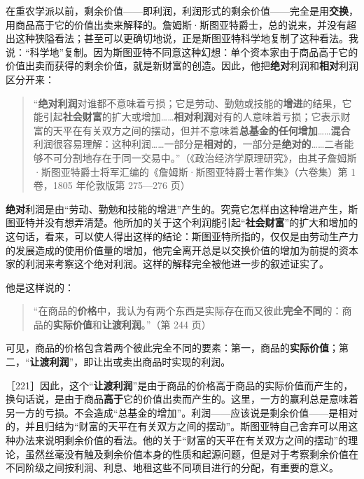 

在重农学派以前，剩余价值——即利润，利润形式的剩余价值——完全是用\textbf{交换}，用商品高于它的价值出卖来解释的。詹姆斯·斯图亚特爵士，总的说来，并没有超出这种狭隘看法；甚至可以更确切地说，正是斯图亚特科学地复制了这种看法。我说：“科学地”复制。因为斯图亚特不同意这种幻想：单个资本家由于商品高于它的价值出卖而获得的剩余价值，就是新财富的创造。因此，他把\textbf{绝对}利润和\textbf{相对}利润区分开来：

\begin{quote}“\textbf{绝对利润}对谁都不意味着亏损；它是劳动、勤勉或技能的\textbf{增进}的结果，它能引起\textbf{社会财富}的扩大或增加……\textbf{相对利润}对有的人意味着亏损；它表示财富的天平在有关双方之间的摆动，但并不意味着\textbf{总基金的任何增加}……\textbf{混合}利润很容易理解：这种利润……一部分是\textbf{相对的}，一部分是\textbf{绝对的}……二者能够不可分割地存在于同一交易中。”（《政治经济学原理研究》，由其子詹姆斯·斯图亚特爵士将军汇编的《詹姆斯·斯图亚特爵士著作集》（六卷集）第 1 卷，1805 年伦敦版第 275—276 页）\end{quote}

\textbf{绝对}利润是由“劳动、勤勉和技能的增进”产生的。究竟它怎样由这种增进产生，斯图亚特并没有想弄清楚。他所加的关于这个利润能引起“\textbf{社会财富}”的扩大和增加的这句话，看来，可以使人得出这样的结论：斯图亚特所指的，仅仅是由劳动生产力的发展造成的使用价值量的增加，他完全离开总是以交换价值的增加为前提的资本家的利润来考察这个绝对利润。这样的解释完全被他进一步的叙述证实了。

他是这样说的：

\begin{quote}“在商品的\textbf{价格}中，我认为有两个东西是实际存在而又彼此\textbf{完全不同}的：商品的\textbf{实际价值}和\textbf{让渡利润}。”（第 244 页）\end{quote}

可见，商品的价格包含着两个彼此完全不同的要素：第一，商品的\textbf{实际价值}；第二，“\textbf{让渡利润}”，即让出或卖出商品时实现的利润。

［221］因此，这个“\textbf{让渡利润}”是由于商品的价格高于商品的实际价值而产生的，换句话说，是由于商品\textbf{高于}它的价值出卖而产生的。这里，一方的赢利总是意味着另一方的亏损。不会造成“总基金的增加”。利润——应该说是剩余价值——是相对的，并且归结为“财富的天平在有关双方之间的摆动”。斯图亚特自己舍弃可以用这种办法来说明剩余价值的看法。他的关于“财富的天平在有关双方之间的摆动”的理论，虽然丝毫没有触及剩余价值本身的性质和起源问题，但是对于考察剩余价值在不同阶级之间按利润、利息、地租这些不同项目进行的分配，有重要的意义。

